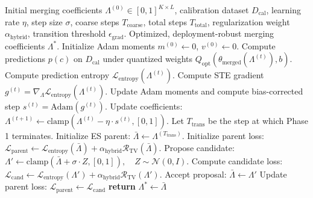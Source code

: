 \documentclass{article}
\theoremstyle{plain}
\theoremstyle{definition}
\theoremstyle{remark}
\begin{document}
\begin{algorithm}[tb]
\caption{Proposed Hybrid Optimization Pipeline for Robust Low-Bit Model Merging}
\label{alg:hybrid_opt}
\begin{algorithmic}[1]
 Initial merging coefficients $\Lambda^{(0)} \in [0, 1]^{K \times L}$, calibration dataset $D_{\text{cal}}$, learning rate $\eta$, step size $\sigma$, coarse steps $T_{\text{coarse}}$, total steps $T_{\text{total}}$, regularization weight $\alpha_{\text{hybrid}}$, transition threshold $\epsilon_{\text{grad}}$.
 Optimized, deployment-robust merging coefficients $\Lambda^*$.
\STATE Initialize Adam moments $m^{(0)} \leftarrow 0$, $v^{(0)} \leftarrow 0$.
\STATE {}
    \STATE Compute predictions $p(c)$ on $D_{\text{cal}}$ under quantized weights $Q_{\text{opt}}(\theta_{\text{merged}}(\Lambda^{(t)}), b)$.
    \STATE Compute prediction entropy $\mathcal{L}_{\text{entropy}}(\Lambda^{(t)})$.
    \STATE Compute STE gradient $g^{(t)} = \nabla_{\Lambda} \mathcal{L}_{\text{entropy}}(\Lambda^{(t)})$.
    \STATE Update Adam moments and compute bias-corrected step $s^{(t)} = \text{Adam}(g^{(t)})$.
    \STATE Update coefficients: $\Lambda^{(t+1)} \leftarrow \text{clamp}\left(\Lambda^{(t)} - \eta \cdot s^{(t)}, [0, 1]\right)$.
         
    \ENDIF
\ENDFOR
\STATE Let $T_{\text{trans}}$ be the step at which Phase 1 terminates.
\STATE Initialize ES parent: $\bar{\Lambda} \leftarrow \Lambda^{(T_{\text{trans}})}$.
\STATE Initialize parent loss: $\mathcal{L}_{\text{parent}} \leftarrow \mathcal{L}_{\text{entropy}}(\bar{\Lambda}) + \alpha_{\text{hybrid}} \mathcal{R}_{\text{TV}}(\bar{\Lambda})$.
\STATE {}
    \STATE Propose candidate: $\Lambda' \leftarrow \text{clamp}\left(\bar{\Lambda} + \sigma \cdot Z, [0, 1]\right), \quad Z \sim \mathcal{N}(0, I)$.
    \STATE Compute candidate loss: $\mathcal{L}_{\text{cand}} \leftarrow \mathcal{L}_{\text{entropy}}(\Lambda') + \alpha_{\text{hybrid}} \mathcal{R}_{\text{TV}}(\Lambda')$.
        \STATE Accept proposal: $\bar{\Lambda} \leftarrow \Lambda'$
        \STATE Update parent loss: $\mathcal{L}_{\text{parent}} \leftarrow \mathcal{L}_{\text{cand}}$
    \ENDIF
\ENDFOR
\STATE \textbf{return} $\Lambda^* \leftarrow \bar{\Lambda}$
\end{algorithmic}
\end{algorithm}
\end{document}
